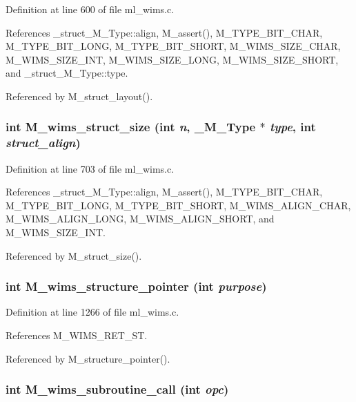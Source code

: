 Definition at line 600 of file ml\_\-wims.c.

References \_\-struct\_\-M\_\-Type::align, M\_\-assert(), M\_\-TYPE\_\-BIT\_\-CHAR, M\_\-TYPE\_\-BIT\_\-LONG, M\_\-TYPE\_\-BIT\_\-SHORT, M\_\-WIMS\_\-SIZE\_\-CHAR, M\_\-WIMS\_\-SIZE\_\-INT, M\_\-WIMS\_\-SIZE\_\-LONG, M\_\-WIMS\_\-SIZE\_\-SHORT, and \_\-struct\_\-M\_\-Type::type.

Referenced by M\_\-struct\_\-layout().
\subsubsection{\setlength{\rightskip}{0pt plus 5cm}int M\_\-wims\_\-struct\_\-size (int {\em n}, \bf{\_\-M\_\-Type} $\ast$ {\em type}, int {\em struct\_\-align})}\label{ml__wims_8c_c046d2dbeca5c92cd1e6f6b73f7b97c6}




Definition at line 703 of file ml\_\-wims.c.

References \_\-struct\_\-M\_\-Type::align, M\_\-assert(), M\_\-TYPE\_\-BIT\_\-CHAR, M\_\-TYPE\_\-BIT\_\-LONG, M\_\-TYPE\_\-BIT\_\-SHORT, M\_\-WIMS\_\-ALIGN\_\-CHAR, M\_\-WIMS\_\-ALIGN\_\-LONG, M\_\-WIMS\_\-ALIGN\_\-SHORT, and M\_\-WIMS\_\-SIZE\_\-INT.

Referenced by M\_\-struct\_\-size().
\subsubsection{\setlength{\rightskip}{0pt plus 5cm}int M\_\-wims\_\-structure\_\-pointer (int {\em purpose})}\label{ml__wims_8c_ca63b33e49ddd314061fc0d1f6060726}




Definition at line 1266 of file ml\_\-wims.c.

References M\_\-WIMS\_\-RET\_\-ST.

Referenced by M\_\-structure\_\-pointer().
\subsubsection{\setlength{\rightskip}{0pt plus 5cm}int M\_\-wims\_\-subroutine\_\-call (int {\em opc})}\label{ml__wims_8c_7af3bb2870d3ec824153339ddaa32e45}




